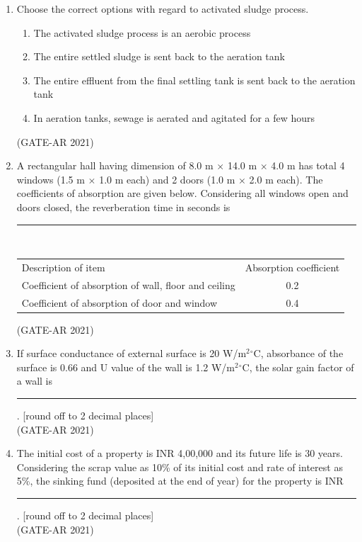 \documentclass[a4paper,10pt]{article}
\begin{document}
\begin{enumerate}
    \item Choose the correct options with regard to activated sludge process.
    \begin{enumerate}
    \item The activated sludge process is an aerobic process
    \item The entire settled sludge is sent back to the aeration tank
    \item The entire effluent from the final settling tank is sent back to the aeration tank
    \item In aeration tanks, sewage is aerated and agitated for a few hours
    \end{enumerate}
    \hfill (GATE-AR 2021)

    \item A rectangular hall having dimension of 8.0 m $\times$ 14.0 m $\times$ 4.0 m has total 4 windows (1.5 m $\times$ 1.0 m each) and 2 doors (1.0 m $\times$ 2.0 m each). The coefficients of absorption are given below. Considering all windows open and doors closed, the reverberation time in seconds is \rule{2cm}{0.4pt} \\
    \begin{tabular}{ l c }
    Description of item & Absorption coefficient \\
    Coefficient of absorption of wall, floor and ceiling & 0.2 \\
    Coefficient of absorption of door and window & 0.4 \\
    \end{tabular}
    \hfill (GATE-AR 2021)

    \item If surface conductance of external surface is 20 W/m$^2$$^\circ$C, absorbance of the surface is 0.66 and U value of the wall is 1.2 W/m$^2$$^\circ$C, the solar gain factor of a wall is \rule{2cm}{0.4pt}. [round off to 2 decimal places] \\
    \hfill (GATE-AR 2021)

    \item The initial cost of a property is INR 4,00,000 and its future life is 30 years. Considering the scrap value as 10\% of its initial cost and rate of interest as 5\%, the sinking fund (deposited at the end of year) for the property is INR \rule{2cm}{0.4pt}. [round off to 2 decimal places] \\
    \hfill (GATE-AR 2021)


\end{enumerate}
\end{document}
